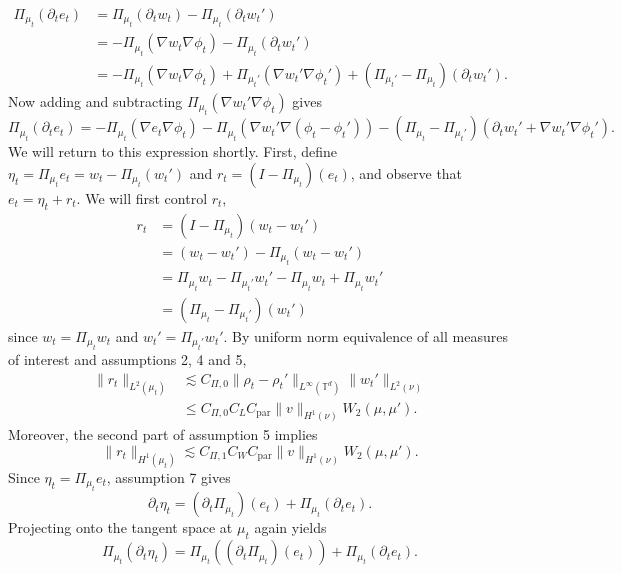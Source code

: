 \documentclass[11pt]{article}
\begin{document}
\begin{align*}
\Pi_{\mu_t}(\partial_t e_t) &= \Pi_{\mu_t}(\partial_t w_t) - \Pi_{\mu_t}(\partial_t w_t') \\
    &= -\Pi_{\mu_t}(\nabla w_t \nabla \phi_t) - \Pi_{\mu_t}(\partial_t w_t') \\
    &= -\Pi_{\mu_t}(\nabla w_t \nabla \phi_t) + \Pi_{\mu_t'}(\nabla w_t' \nabla \phi_t') + (\Pi_{\mu_t'} - \Pi_{\mu_t})(\partial_t w_t').
\end{align*}
Now adding and subtracting $\Pi_{\mu_t}(\nabla w_t'\nabla\phi_t)$ gives
\begin{equation}
\Pi_{\mu_t}(\partial_t e_t) = -\Pi_{\mu_t}(\nabla e_t \nabla \phi_t) - \Pi_{\mu_t}(\nabla w_t' \nabla(\phi_t - \phi_t'))
- (\Pi_{\mu_t} - \Pi_{\mu_t'})(\partial_tw_t' + \nabla w_t'\nabla \phi_t'). \label{eq: projected derivative}
\end{equation}
We will return to this expression shortly. First, define $\eta_t = \Pi_{\mu_t}e_t = w_t - \Pi_{\mu_t}(w_t')$ and $r_t = (I - \Pi_{\mu_t})(e_t)$, and observe that $e_t = \eta_t + r_t$. We will first control $r_t$,
\begin{align*}
    r_t &= (I - \Pi_{\mu_t})(w_t - w_t') \\
        &= (w_t - w_t') - \Pi_{\mu_t}(w_t - w_t') \\
        &= \Pi_{\mu_t}w_t - \Pi_{\mu_t'}w_t' - \Pi_{\mu_t}w_t + \Pi_{\mu_t}w_t' \\
        &= (\Pi_{\mu_t} - \Pi_{\mu_t'})(w_t')
\end{align*}
since $w_t = \Pi_{\mu_t}w_t$ and $w_t' = \Pi_{\mu_t'}w_t'$. By uniform norm equivalence of all measures of interest and assumptions 2, 4 and 5, \begin{align*}\|r_t\|_{L^2(\mu_t)} &\lesssim   C_{\Pi, 0}\|\rho_t - \rho_t'\|_{L^\infty(\mathbb{T}^d)}\|w_t'\|_{L^2(\nu)}\\
&\leq C_{\Pi,0} C_L C_{\text{par}}\|v\|_{H^1(\nu)}W_2(\mu, \mu').\end{align*}
Moreover, the second part of assumption 5 implies 
\begin{equation}
    \|r_t\|_{H^1(\mu_t)} \lesssim  C_{\Pi, 1}C_W C_{\text{par}}\|v\|_{H^1(\nu)}W_2(\mu, \mu').
\end{equation}
Since $\eta_t = \Pi_{\mu_t}e_t$, assumption 7 gives
\[\partial_t\eta_t = (\partial_t\Pi_{\mu_t})(e_t) + \Pi_{\mu_t}(\partial_te_t).\]
Projecting onto the tangent space at $\mu_t$ again yields
\[\Pi_{\mu_t}(\partial_t\eta_t) = \Pi_{\mu_t}((\partial_t\Pi_{\mu_t})(e_t)) + \Pi_{\mu_t}(\partial_te_t).\]
\end{document}

